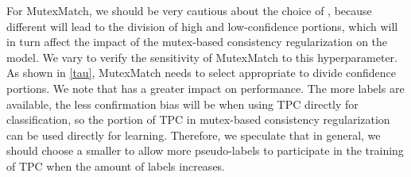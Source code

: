 \documentclass[lettersize,journal]{IEEEtran}
\theoremstyle{plain}
\theoremstyle{definition}
\theoremstyle{remark}
\begin{document}
For MutexMatch, we should be very cautious about the choice of , because different  will lead to the division of high and low-confidence portions, which will in turn affect the impact of the mutex-based consistency regularization on the model. 
We vary  to verify the sensitivity of MutexMatch to this hyperparameter.  
As shown  in \cref{tau}, MutexMatch needs to select appropriate  to divide confidence portions. 
We note that  has a greater impact on performance. The more labels are available, the less confirmation bias will be when using TPC directly for classification, 
so the portion of TPC in mutex-based consistency regularization can be used directly for learning. 
Therefore, we speculate that in general, we should choose a smaller  to allow more pseudo-labels to participate in the training of TPC when the amount of labels increases. 
\end{document}
